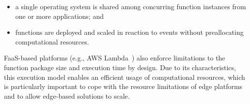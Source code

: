 \begin{itemize}
    \item a single operating system is shared among concurring function instances from one or more applications; and
    \item functions are deployed and scaled in reaction to events without preallocating computational resources.
\end{itemize}

FaaS-based platforms (e.g., AWS Lambda~\cite{AWSLambda}) also enforce limitations to the function package size and execution time by design. Due to its characteristics, this execution model enables an efficient usage of computational resources, which is particularly important to cope with the resource limitations of edge platforms and to allow edge-based solutions to scale.




%



